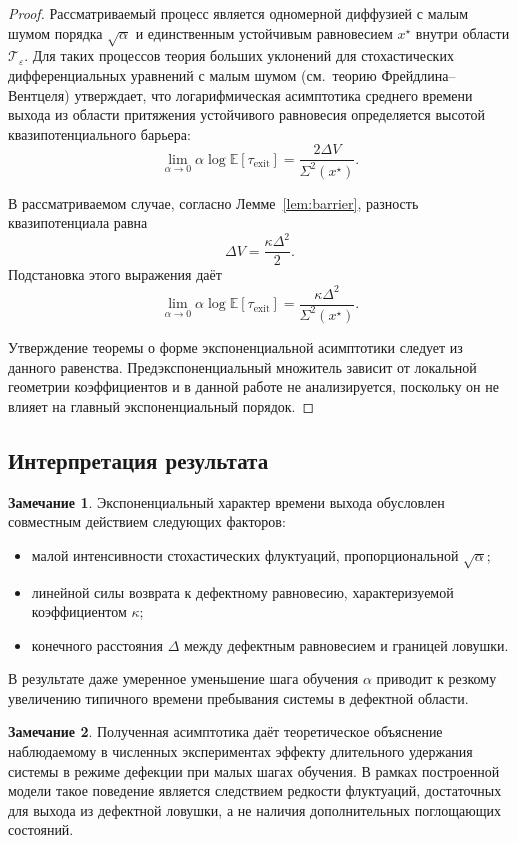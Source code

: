 \documentclass[12pt,a4paper]{article}
\theoremstyle{definition}
\newtheorem{remark}{Замечание}
\begin{document}
\begin{proof}
Рассматриваемый процесс является одномерной диффузией
с малым шумом порядка $\sqrt{\alpha}$
и единственным устойчивым равновесием $x^\star$
внутри области $\mathcal T_\varepsilon$.
Для таких процессов теория больших уклонений
для стохастических дифференциальных уравнений
с малым шумом
(см.\ теорию Фрейдлина--Вентцеля)
утверждает,
что логарифмическая асимптотика
среднего времени выхода
из области притяжения устойчивого равновесия
определяется высотой квазипотенциального барьера:
\[
\lim_{\alpha\to0}
\alpha \log \mathbb E[\tau_{\mathrm{exit}}]
=
\frac{2\Delta V}{\Sigma^2(x^\star)}.
\]

В рассматриваемом случае,
согласно Лемме~\ref{lem:barrier},
разность квазипотенциала равна
\[
\Delta V
=
\frac{\kappa \Delta^2}{2}.
\]
Подстановка этого выражения
даёт
\[
\lim_{\alpha\to0}
\alpha \log \mathbb E[\tau_{\mathrm{exit}}]
=
\frac{\kappa \Delta^2}{\Sigma^2(x^\star)}.
\]

Утверждение теоремы
о форме экспоненциальной асимптотики
следует из данного равенства.
Предэкспоненциальный множитель
зависит от локальной геометрии коэффициентов
и в данной работе не анализируется,
поскольку он не влияет
на главный экспоненциальный порядок.
\end{proof}


\subsection{Интерпретация результата}

\begin{remark}
Экспоненциальный характер времени выхода
обусловлен совместным действием следующих факторов:
\begin{itemize}
\item малой интенсивности стохастических флуктуаций,
пропорциональной $\sqrt{\alpha}$;
\item линейной силы возврата к дефектному равновесию,
характеризуемой коэффициентом $\kappa$;
\item конечного расстояния $\Delta$
между дефектным равновесием и границей ловушки.
\end{itemize}
В результате даже умеренное уменьшение шага обучения $\alpha$
приводит к резкому увеличению
типичного времени пребывания системы
в дефектной области.
\end{remark}

\begin{remark}
Полученная асимптотика
даёт теоретическое объяснение
наблюдаемому в численных экспериментах эффекту
длительного удержания системы
в режиме дефекции
при малых шагах обучения.
В рамках построенной модели
такое поведение является следствием
редкости флуктуаций,
достаточных для выхода из дефектной ловушки,
а не наличия дополнительных поглощающих состояний.
\end{remark}
\end{document}
